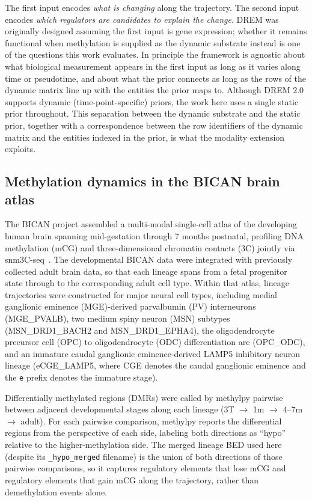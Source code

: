 The first input encodes \emph{what is changing} along the trajectory. The second input encodes \emph{which regulators are candidates to explain the change}. DREM was originally designed assuming the first input is gene expression; whether it remains functional when methylation is supplied as the dynamic substrate instead is one of the questions this work evaluates. In principle the framework is agnostic about what biological measurement appears in the first input as long as it varies along time or pseudotime, and about what the prior connects as long as the rows of the dynamic matrix line up with the entities the prior maps to. Although DREM 2.0 supports dynamic (time-point-specific) priors, the work here uses a single static prior throughout. This separation between the dynamic substrate and the static prior, together with a correspondence between the row identifiers of the dynamic matrix and the entities indexed in the prior, is what the modality extension exploits.

\subsection{Methylation dynamics in the BICAN brain atlas}

The BICAN project assembled a multi-modal single-cell atlas of the developing human brain spanning mid-gestation through 7 months postnatal, profiling DNA methylation (mCG) and three-dimensional chromatin contacts (3C) jointly via snm3C-seq~\cite{bican2026manuscript}. The developmental BICAN data were integrated with previously collected adult brain data, so that each lineage spans from a fetal progenitor state through to the corresponding adult cell type. Within that atlas, lineage trajectories were constructed for major neural cell types, including medial ganglionic eminence (MGE)-derived parvalbumin (PV) interneurons (MGE\_PVALB), two medium spiny neuron (MSN) subtypes (MSN\_DRD1\_BACH2 and MSN\_DRD1\_EPHA4), the oligodendrocyte precursor cell (OPC) to oligodendrocyte (ODC) differentiation arc (OPC\_ODC), and an immature caudal ganglionic eminence-derived LAMP5 inhibitory neuron lineage (eCGE\_LAMP5, where CGE denotes the caudal ganglionic eminence and the \texttt{e} prefix denotes the immature stage).

Differentially methylated regions (DMRs) were called by methylpy pairwise between adjacent developmental stages along each lineage (3T $\rightarrow$ 1m $\rightarrow$ 4--7m $\rightarrow$ adult). For each pairwise comparison, methylpy reports the differential regions from the perspective of each side, labeling both directions as ``hypo'' relative to the higher-methylation side. The merged lineage BED used here (despite its \texttt{\_hypo\_merged} filename) is the union of both directions of those pairwise comparisons, so it captures regulatory elements that lose mCG and regulatory elements that gain mCG along the trajectory, rather than demethylation events alone.


